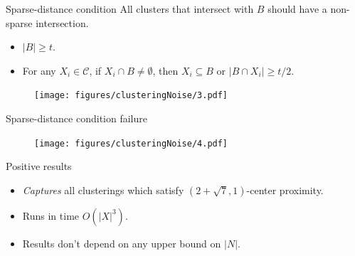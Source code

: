 \documentclass{beamer}
\newcommand{\mc}{\mathcal}
\begin{document}
\begin{frame}{Sparse-distance condition}
    All clusters that intersect with $B$ should have a non-sparse intersection. 
	\begin{itemize}
	  \item $|B| \ge t$.
	  \item For any $X_i \in \mc C$, if $X_i \cap B \neq \emptyset$, then $X_i \subseteq B$ or $|B \cap X_i| \ge t/2$.
	\end{itemize}

   \begin{figure}
	  \texttt{[image: figures/clusteringNoise/3.pdf]}
   \end{figure}
\end{frame}

\begin{frame}{Sparse-distance condition failure}   
   \begin{figure}
	  \texttt{[image: figures/clusteringNoise/4.pdf]}
   \end{figure}
\end{frame}

\begin{frame}{Positive results}
	\begin{itemize}
		\item \textit{Captures} all clusterings which satisfy $(2+\sqrt{7}, 1)$-center proximity.
	
		\vspace{30pt}\item Runs in time $O(|X|^3)$.
	
		\vspace{30pt}\item Results \alert{don't} depend on any \alert{upper bound} on $|N|$.
	\end{itemize}
\end{frame}
\end{document}
